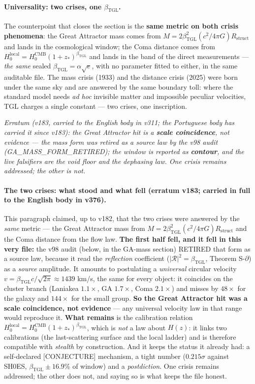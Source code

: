 \documentclass[11pt]{article}
\newcommand{\bTGL}{\beta_{\mathrm{TGL}}}\newcommand{\Msun}{M_{\odot}}\newcommand{\TGL}{\mathrm{TGL}}
\theoremstyle{definition}\newtheorem{deriv}{Derivation}
\begin{document}
\paragraph{Universality: two crises, one $\bTGL$.} The counterpoint that closes the section is the \textbf{same metric on both crisis phenomena}: the Great Attractor mass comes from $M=2\bTGL^2(c^2/4\pi G)R_{\mathrm{struct}}$ and lands in the cosmological window; the Coma distance comes from $H_0^{\mathrm{local}}=H_0^{\mathrm{CMB}}(1+z_*)^{\bTGL}$ and lands in the band of the direct measurements --- \emph{the same} sealed $\bTGL=\alpha\sqrt e$, with no parameter fitted to either, in the same auditable file. The mass crisis (1933) and the distance crisis (2025) were born under the same sky and are answered by the same boundary toll: where the standard model needs \emph{ad hoc} invisible matter and impossible peculiar velocities, TGL charges a single constant --- two crises, one inscription.

\emph{Erratum (v183, carried to the English body in v311; the Portuguese body has carried it since v183): the Great Attractor hit is a \textbf{scale coincidence}, not evidence --- the mass form was retired as a source law by the v98 audit (\textsf{GA\_MASS\_FORM\_RETIRED}); the window is reported as \textbf{contour}, and the live falsifiers are the void floor and the dephasing law. One crisis remains addressed; the other is not.}

\paragraph{The two crises: what stood and what fell (erratum v183; carried in full to the English body in v376).} This paragraph claimed, up to v182, that the two crises were answered by the \emph{same} metric --- the Great Attractor mass from $M=2\bTGL^2(c^2/4\pi G)R_{\mathrm{struct}}$ and the Coma distance from the flow law. \textbf{The first half fell, and it fell in this very file:} the v98 audit (below, in the GA-mass section) RETIRED that form as a source law, because it read the \emph{reflection} coefficient ($|\mathcal{R}|^2=\bTGL$, Theorem S-$\partial$) as a \emph{source} amplitude. It amounts to postulating a \emph{universal} circular velocity $v=\bTGL c/\sqrt{2\pi}\approx 1439$ km/s, the same for every object: it coincides on the cluster branch (Laniakea $1.1\times$, GA $1.7\times$, Coma $2.1\times$) and misses by $48\times$ for the galaxy and $144\times$ for the small group. \textbf{So the Great Attractor hit was a scale coincidence, not evidence} --- any universal velocity law in that range would reproduce it. \textbf{What remains} is the calibration relation $H_0^{\mathrm{local}}=H_0^{\mathrm{CMB}}(1+z_*)^{\bTGL}$, which is \emph{not} a law about $H(z)$: it links two calibrations (the last-scattering surface and the local ladder) and is therefore compatible with \emph{stealth} by construction. And it keeps the status it already had: a self-declared \textsf{[CONJECTURE]} mechanism, a tight number ($0.215\sigma$ against SH0ES, $\bTGL\pm16.9\%$ of window) and a \emph{postdiction}. One crisis remains addressed; the other does not, and saying so is what keeps the file honest.
\end{document}
